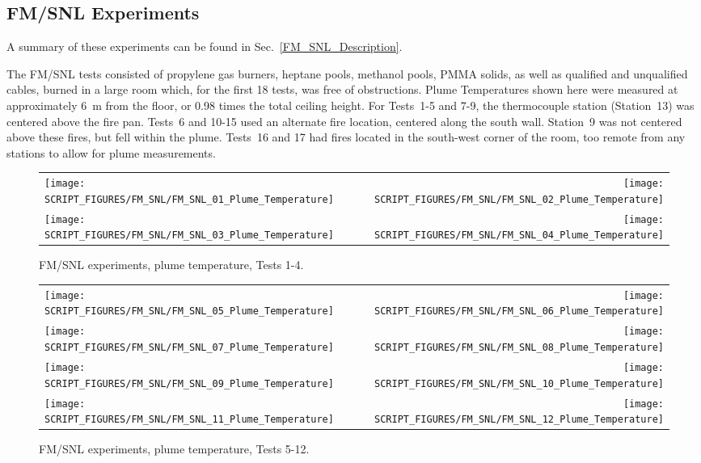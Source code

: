\clearpage

\subsection{FM/SNL Experiments}
\label{FM_SNL_Plume_Temperature}

A summary of these experiments can be found in Sec.~\ref{FM_SNL_Description}.

The FM/SNL tests consisted of propylene gas burners, heptane pools, methanol pools, PMMA solids, as well as qualified and unqualified cables, burned in a large room which, for the first 18 tests, was free of obstructions. Plume Temperatures shown here were measured at approximately 6~m from the floor, or 0.98 times the total ceiling height. For Tests~1-5 and 7-9, the thermocouple station (Station~13) was centered above the fire pan. Tests~6 and 10-15 used an alternate fire location, centered along the south wall. Station~9 was not centered above these fires, but fell within the plume. Tests~16 and 17 had fires located in the south-west corner of the room, too remote from any stations to allow for plume measurements.

\begin{figure}[!h]
\begin{tabular*}{\textwidth}{l@{\extracolsep{\fill}}r}
\texttt{[image: SCRIPT\_FIGURES/FM\_SNL/FM\_SNL\_01\_Plume\_Temperature]} &
\texttt{[image: SCRIPT\_FIGURES/FM\_SNL/FM\_SNL\_02\_Plume\_Temperature]} \\
\texttt{[image: SCRIPT\_FIGURES/FM\_SNL/FM\_SNL\_03\_Plume\_Temperature]} &
\texttt{[image: SCRIPT\_FIGURES/FM\_SNL/FM\_SNL\_04\_Plume\_Temperature]}
\end{tabular*}
\caption[FM/SNL experiments, plume temperature, Tests 1-4]
{FM/SNL experiments, plume temperature, Tests 1-4.}
\label{FM_SNL_Plume_1}
\end{figure}

\newpage

\begin{figure}[p]
\begin{tabular*}{\textwidth}{l@{\extracolsep{\fill}}r}
\texttt{[image: SCRIPT\_FIGURES/FM\_SNL/FM\_SNL\_05\_Plume\_Temperature]} &
\texttt{[image: SCRIPT\_FIGURES/FM\_SNL/FM\_SNL\_06\_Plume\_Temperature]} \\
\texttt{[image: SCRIPT\_FIGURES/FM\_SNL/FM\_SNL\_07\_Plume\_Temperature]} &
\texttt{[image: SCRIPT\_FIGURES/FM\_SNL/FM\_SNL\_08\_Plume\_Temperature]} \\
\texttt{[image: SCRIPT\_FIGURES/FM\_SNL/FM\_SNL\_09\_Plume\_Temperature]} &
\texttt{[image: SCRIPT\_FIGURES/FM\_SNL/FM\_SNL\_10\_Plume\_Temperature]} \\
\texttt{[image: SCRIPT\_FIGURES/FM\_SNL/FM\_SNL\_11\_Plume\_Temperature]} &
\texttt{[image: SCRIPT\_FIGURES/FM\_SNL/FM\_SNL\_12\_Plume\_Temperature]}
\end{tabular*}
\caption[FM/SNL experiments, plume temperature, Tests 5-12]
{FM/SNL experiments, plume temperature, Tests 5-12.}
\label{FM_SNL_Plume_2}
\end{figure}

